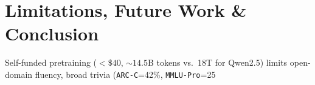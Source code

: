 \documentclass[10pt,twocolumn,letterpaper]{article}
\begin{document}
\section{Limitations, Future Work & Conclusion}
Self-funded pretraining ($<\$40$, $\sim 14.5$B tokens vs.\ 18T for Qwen2.5) limits open-domain fluency, broad trivia (\texttt{ARC-C}=42\%, \texttt{MMLU-Pro}=25%



\end{document}
